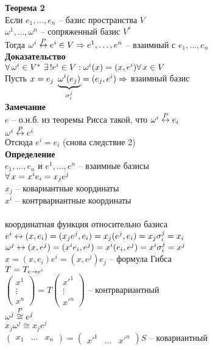 \documentclass[12pt]{article}
\begin{document}
\textbf{Теорема 2}\\
Если $e_1, \ldots, e_n$ -- базис пространства $V$\\
$\omega^1, \ldots, \omega^n$ -- сопряженный базис $V^*$\\
Тогда $\omega^i \os{P}\lrto e^i \in V \Rto e^1, \ldots, e^n$ -- взаимный с $e_1, \ldots, e_n$\\
\textbf{Доказательство}\\
$\fall \omega^i \in V^*\ \ex! e^i \in V: \omega^i(x) = (x, e^i) \fall x \in V$\\
Пусть $x = e_j\ \ub{\sigma_i^j}{\omega^i(e_j)} = (e_j, e^i) \Rto $ взаимный базис\\
\textbf{Замечание}\\
$e$ -- о.н.б. из теоремы Рисса такой, что $\omega^i \os P\lrto e_i$\\
$\omega^i \os P\lrto e^i$\\
Отсюда $e^i = e_i$ (снова следствие 2)\\
\textbf{Определение}\\
$e_1, \ldots, e_n$ и $e^1, \ldots, e^n$ -- взаимные базисы\\
$\fall x = x^ie_i = x_j e^j$\\
$x_j$ -- ковариантные координаты\\
$x^i$ -- контрвариантные координаты\\\\
координатная функция относительно базиса $e^i \lrto (x, e_i) = (x_j e^j, e_i) = x_j (e^j, e_i) = x_j \sigma_i^j = x_i$\\
$\omega^j \lrto (x, e^j) = (x^i e_i, e^j) = x^i(e_i, e^j) = x^i\sigma^j_i = x^j$\\
$x = (x, e_i)e^i = (x, e^j)e_j$ -- формула Гибса\\
$T= T_{e\rto e'}$\\
$\begin{pmatrix}x^1\\\vdots\\x^n\end{pmatrix} = T\begin{pmatrix}x'^1\\\vdots\\x'^n\end{pmatrix}$ -- контрвариантный\\
$\omega^j \os P \cong e^j$\\
$x_j \omega^j \cong x_j  e^j$\\
$\begin{pmatrix}x_1 & \ldots & x_n\end{pmatrix} = \begin{pmatrix}x'^1 & \ldots &x'^n\end{pmatrix}S$ -- ковариантный\\\\
\end{document}
